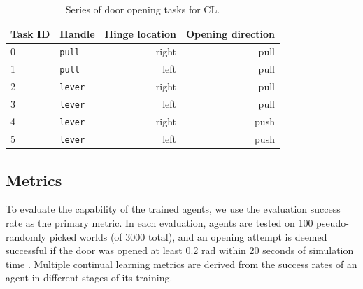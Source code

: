 \documentclass[dvipsnames]{article} %
\begin{document}
\begin{table}[b]
\caption{Series of door opening tasks for CL.}
\label{tab:tasksequence}
\begin{center}
\begin{tabular}{@{}llrr@{}}
\toprule
Task ID & Handle & Hinge location & Opening direction \\ 
\midrule
0 & \texttt{pull}  & right & pull \\
1 & \texttt{pull}  & left  & pull \\
2 & \texttt{lever} & right & pull \\
3 & \texttt{lever} & left  & pull \\
4 & \texttt{lever} & right & push \\
5 & \texttt{lever} & left  & push \\
\bottomrule
\end{tabular}
\end{center}
\end{table}



\subsection{Metrics}
\label{chap:metrics}
To evaluate the capability of the trained agents, we use the evaluation success rate as the primary metric. In each evaluation, agents are tested on 100 pseudo-randomly picked worlds (of 3000 total), and an opening attempt is deemed successful if the door was opened at least 0.2 rad within 20 seconds of simulation time \citep{doorgym}. Multiple continual learning metrics are derived from the success rates of an agent in different stages of its training.
\end{document}

